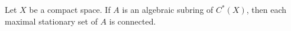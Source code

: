 Let $X$ be a compact space. If $A$ is an algebraic subring of $C^*(X)$, then each maximal stationary set of $A$ is connected.
